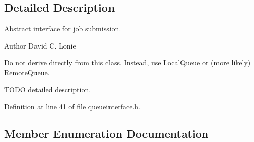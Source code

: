 \subsection{Detailed Description}
Abstract interface for job submission. 

\begin{DoxyAuthor}{Author}
David C. Lonie
\end{DoxyAuthor}
Do not derive directly from this class. Instead, use Local\+Queue or (more likely) Remote\+Queue.

T\+O\+D\+O detailed description. 

Definition at line 41 of file queueinterface.\+h.



\subsection{Member Enumeration Documentation}
\hypertarget{classGlobalSearch_1_1QueueInterface_a08dcf06d1b99f6333472470490ca9a6d}{}
